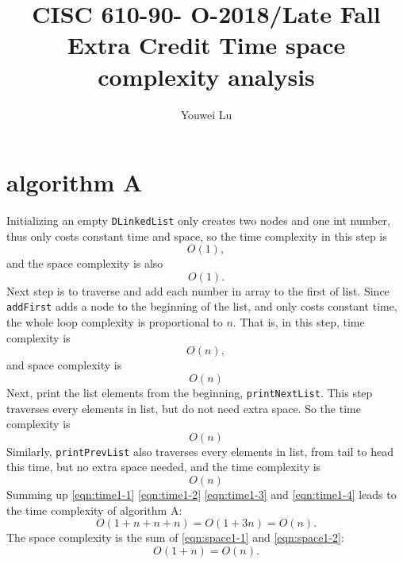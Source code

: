 \documentclass[natbib,12pt]{article}
\title{CISC 610-90- O-2018/Late Fall \linebreak Extra Credit \linebreak Time \/ space complexity analysis}
\author{Youwei Lu}
\date{}
\begin{document}
\maketitle
	
\section{algorithm A}
	Initializing an empty {\tt DLinkedList} only creates two nodes and one int number, thus only costs constant time and space, so the time complexity in this step is
	\begin{equation}
		O(1),  \label{eqn:time1-1}
	\end{equation}
	and the space complexity is also 
	\begin{equation}
		O(1). \label{eqn:space1-1}
	\end{equation}
	Next step is to traverse and add each number in array to the first of list. Since {\tt addFirst} adds a node to the beginning of the list, and only costs constant time, the whole loop complexity is proportional to $n$. That is, in this step, time complexity is
	\begin{equation}
		O(n), \label{eqn:time1-2}
	\end{equation}
	and space complexity is
	\begin{equation}
		O(n) \label{eqn:space1-2}
	\end{equation}
	Next, print the list elements from the beginning, {\tt printNextList}. This step traverses every elements in list, but do not need extra space. So the time complexity is
	\begin{equation}
		O(n) \label{eqn:time1-3}
	\end{equation}
		Similarly, {\tt printPrevList} also traverses every elements in list, from tail to head this time, but no extra space needed, and the time complexity is
	\begin{equation}
		O(n) \label{eqn:time1-4}
	\end{equation}
	Summing up \eqref{eqn:time1-1} \eqref{eqn:time1-2} \eqref{eqn:time1-3} and \eqref{eqn:time1-4} leads to the time complexity of algorithm A:
	\begin{equation}
		O(1 + n + n + n) = O(1 + 3n) = O(n).
	\end{equation}
	The space complexity is the sum of \eqref{eqn:space1-1} and \eqref{eqn:space1-2}:
	\begin{equation}
		O(1 + n) = O(n).
	\end{equation}
\end{document}
